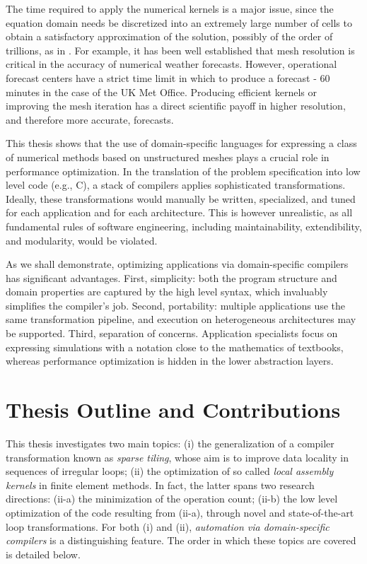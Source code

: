 The time required to apply the numerical kernels is a major issue, since the equation domain needs be discretized into an extremely large number of cells to obtain a satisfactory approximation of the solution, possibly of the order of trillions, as in \cite{Rossinelli2013}. For example, it has been well established that mesh resolution is critical in the accuracy of numerical weather forecasts. However, operational forecast centers have a strict time limit in which to produce a forecast - 60 minutes in the case of the UK Met Office. Producing efficient kernels or improving the mesh iteration has a direct scientific payoff in higher resolution, and therefore more accurate, forecasts. 

This thesis shows that the use of domain-specific languages for expressing a class of numerical methods based on unstructured meshes plays a crucial role in performance optimization. In the translation of the problem specification into low level code (e.g., C), a stack of compilers applies sophisticated transformations. Ideally, these transformations would manually be written, specialized, and tuned for each application and for each architecture. This is however unrealistic, as all fundamental rules of software engineering, including maintainability, extendibility, and modularity, would be violated.

As we shall demonstrate, optimizing applications via domain-specific compilers has significant advantages. First, simplicity: both the program structure and domain properties are captured by the high level syntax, which invaluably simplifies the compiler's job. Second, portability: multiple applications use the same transformation pipeline, and execution on heterogeneous architectures may be supported. Third, separation of concerns. Application specialists focus on expressing simulations with a notation close to the mathematics of textbooks, whereas performance optimization is hidden in the lower abstraction layers. 

\section{Thesis Outline and Contributions}
\label{sec:contributions}
This thesis investigates two main topics: (i) the generalization of a compiler transformation known as {\em sparse tiling}, whose aim is to improve data locality in sequences of irregular loops; (ii) the optimization of so called {\em local assembly kernels} in finite element methods. In fact, the latter spans two research directions: (ii-a) the minimization of the operation count; (ii-b) the low level optimization of the code resulting from (ii-a), through novel and state-of-the-art loop transformations. For both (i) and (ii), {\it automation via domain-specific compilers} is a distinguishing feature. The order in which these topics are covered is detailed below.

